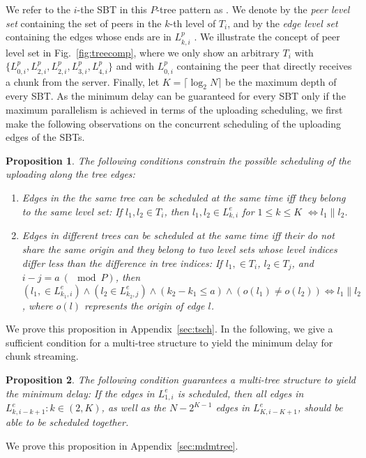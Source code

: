 \documentclass[conference]{IEEEtran}
\newtheorem{prop}{Proposition}
\begin{document}
  We refer to the $i$-the SBT in this $P$-tree pattern as . We denote by  the \textit{peer level set} containing the set of peers in the $k$-th level of $T_i$, and by  the \textit{edge level set} containing the edges whose ends are in $L^p_{k,i}$ .  We illustrate the concept of peer level set in Fig.~\ref{fig:treecomp}, where we only show an arbitrary $T_i$ with $\{L^p_{0,i}, L^p_{2,i}, L^p_{2,i}, L^p_{3,i}, L^p_{4,i}\}$ and with $L^p_{0,i}$ containing the peer that directly receives a chunk from the server. Finally, let $K = \lceil\log_2 N\rceil$ be the maximum depth of every SBT. As the minimum delay can be guaranteed for every SBT only if the maximum parallelism is achieved in terms of the uploading scheduling, we first make the following observations on the concurrent scheduling of the uploading edges of the SBTs.
\vspace{1ex}
  \begin{prop} \label{prop:feasible}
    The following conditions constrain the possible scheduling of the uploading along the tree edges:
\begin{enumerate}
\item Edges in the the same tree can be scheduled at the same time iff they belong to the same level set: If $l_1, l_2 \in T_i$, then $l_1,l_2 \in L^e_{k,i}$ for $1 \leq k \leq K$ $\boldsymbol{\Longleftrightarrow} l_1 \parallel l_2$.
\item Edges in different trees can be scheduled at the same time iff their do not share the same origin and they belong to two level sets whose level indices differ less than the difference in tree indices: If $l_1, \in T_i$, $l_2 \in T_j$, and $i - j = a~ (\!\!\!\!\mod P)$, then $\left(l_1, \in L^e_{k_1,i}\right) \wedge \left(l_2 \in L^e_{k_2,j}\right) \wedge \left(k_2 - k_1 \leq a\right) \wedge \left(o(l_1) \neq o(l_2)\right) \boldsymbol{\Longleftrightarrow} l_1 \parallel l_2$, where $o(l)$ represents the origin of edge $l$.
    \end{enumerate}
\end{prop}
We prove this proposition in Appendix~\ref{sec:tsch}. In the following, we give a sufficient condition for a multi-tree structure to yield the minimum delay for chunk streaming.
\vspace{1ex}
  \begin{prop} \label{prop:sufficient}
    The following condition guarantees a multi-tree structure to yield the minimum delay: If the edges in $L^e_{1,i}$ is scheduled, then all edges in $L^e_{k,i-k+1}:k\in(2,K)$, as well as the $N-2^{K-1}$ edges in $L^e_{K,i-K+1}$, should be able to be scheduled together.
  \end{prop}
  \vspace{1ex}
We prove this proposition in Appendix~\ref{sec:mdmtree}.
\end{document}
